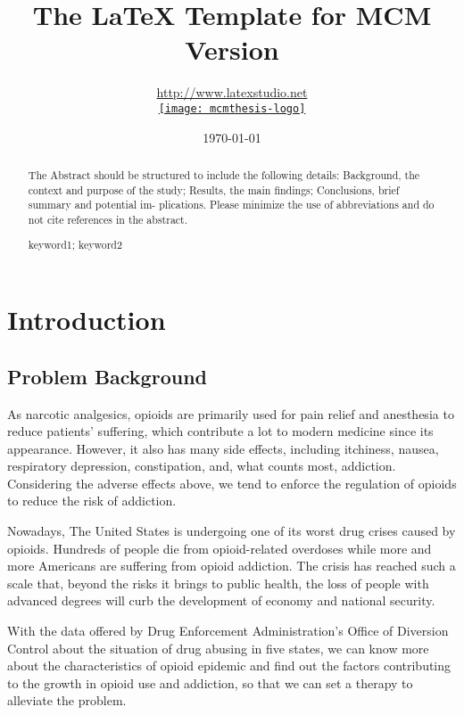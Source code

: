 \documentclass{mcmthesis}
\title{The \LaTeX{} Template for MCM Version \MCMversion}
\author{\url{http://www.latexstudio.net}\\[3pt]  \href{http://www.latexstudio.net/}
  {\texttt{[image: mcmthesis-logo]}}}
\date{\today}
\begin{document}
\begin{abstract}
	The Abstract should be
	structured to include the following details: Background,
	the context and purpose of the study; Results, the main
	findings; Conclusions, brief summary and potential im-
	plications. Please minimize the use of abbreviations and
	do not cite references in the abstract.
	\begin{keywords}
		keyword1; keyword2
	\end{keywords}
\end{abstract}

\maketitle

\tableofcontents
\newpage

\section{Introduction}
	\subsection{Problem Background}
		\par As narcotic analgesics, opioids are primarily used for pain relief and anesthesia to reduce patients' suffering, which contribute a lot to modern medicine since its appearance. However, it also has many side effects, including itchiness, nausea, respiratory depression, constipation, and, what counts most, addiction. Considering the adverse effects above, we tend to enforce the regulation of opioids to reduce the risk of addiction.
		
		Nowadays, The United States is undergoing one of its worst drug crises caused by opioids. Hundreds of people die from opioid-related overdoses while more and more Americans are suffering from opioid addiction. The crisis has reached such a scale that, beyond the risks it brings to public health, the loss of people with advanced degrees will curb the development of economy and national security.
		
		With the data offered by Drug Enforcement Administration's Office of Diversion Control about the situation of drug abusing in five states, we can know more about the characteristics of opioid epidemic and find out the factors contributing to the growth in opioid use and addiction, so that we can set a therapy to alleviate the problem.
\end{document}
